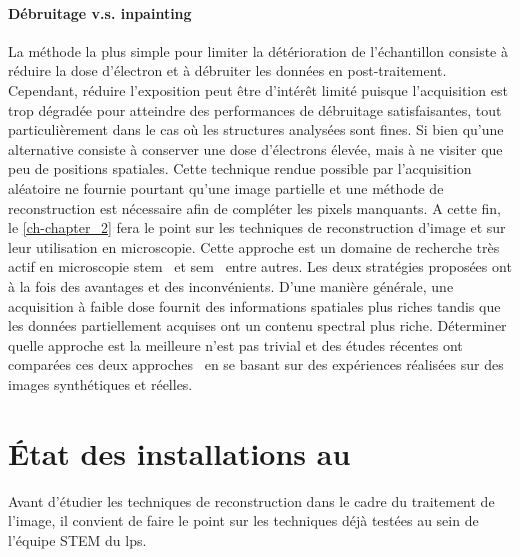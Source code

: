     \paragraph{Débruitage v.s. inpainting} La méthode la plus simple pour limiter la détérioration de l'échantillon consiste à réduire la dose d'électron et à débruiter les données en post-traitement. Cependant, réduire l'exposition peut être d'intérêt limité puisque l'acquisition est trop dégradée pour atteindre des performances de débruitage satisfaisantes, tout particulièrement dans le cas où les structures analysées sont fines.
    Si bien qu'une alternative consiste à conserver une dose d'électrons élevée, mais à ne visiter que peu de positions spatiales. Cette technique rendue possible par l'acquisition aléatoire ne fournie pourtant qu'une image partielle et une méthode de reconstruction est nécessaire afin de compléter les pixels manquants. A cette fin, le \cref{ch-chapter_2} fera le point sur les techniques de reconstruction d'image et sur leur utilisation en microscopie. Cette approche est un domaine de recherche très actif en microscopie \gls{stem}~\cite{beche2016compressed,stevens2014potential} et \gls{sem}~\cite{anderson2013sparse} entre autres.
    Les deux stratégies proposées ont à la fois des avantages et des inconvénients. D'une manière générale, une acquisition à faible dose fournit des informations spatiales plus riches tandis que les données partiellement acquises ont un contenu spectral plus riche. Déterminer quelle approche est la meilleure n'est pas trivial et des études récentes ont comparées ces deux approches~\cite{trampert2018ultramicroscopy} en se basant sur des expériences réalisées sur des images synthétiques et réelles.
    



    \section{\'Etat des installations au }

    Avant d'étudier les techniques de reconstruction dans le cadre du traitement de l'image, il convient de faire le point sur les techniques déjà testées au sein de l'équipe STEM du \gls{lps}.

